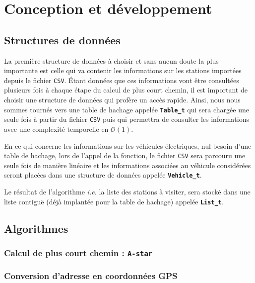 \documentclass[a4paper, 12pt]{report}
\begin{document}
\section{Conception et développement}
\subsection{Structures de données}
La première structure de données à choisir et sans aucun doute la plus importante est celle qui va contenir les informations sur les stations importées depuis le fichier \texttt{CSV}. Étant données que ces informations vont être consultées plusieurs fois à chaque étape du calcul de plus court chemin, il est important de choisir une structure de données qui profère un accès rapide. Ainsi, nous nous sommes tournés vers une table de hachage appelée \textbf{\texttt{Table\_t}} qui sera chargée une seule fois à partir du fichier \texttt{CSV} puis qui permettra de consulter les informations avec une complexité temporelle en $\mathcal{O}(1)$.\par\bigskip
En ce qui concerne les informations sur les véhicules électriques, nul besoin d'une table de hachage, lors de l'appel de la fonction, le fichier \texttt{CSV} sera parcouru une seule fois de manière linéaire et les informations associées au véhicule considérées seront placées dans une structure de données appelée \textbf{\texttt{Vehicle\_t}}.\par\bigskip
Le résultat de l'algorithme \textit{i.e.} la liste des stations à visiter, sera stocké dans une liste contiguë (déjà implantée pour la table de hachage) appelée \textbf{\texttt{List\_t}}.\par\bigskip
\subsection{Algorithmes}
\subsubsection{Calcul de plus court chemin : \texttt{A-star}}
\subsubsection{Conversion d'adresse en coordonnées GPS}
\end{document}
